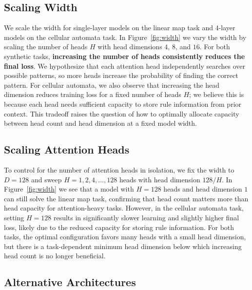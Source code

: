 \documentclass{article}
\newcommand{\xxcomment}[4]{}
\newcommand{\vatsal}[1]{}
\newcommand{\xxcomment}[4]{\textcolor{#1}{[$^{\textsc{#2}}_{\textsc{#3}}$ #4]}}
\newcommand{\vatsal}[1]{\xxcomment{pinkypink}{V}{B}{#1}}
\begin{document}
\subsection{Scaling Width}
\label{sec:width}
We scale the width for single-layer models on the linear map task and $4$-layer models on the cellular automata task. In Figure~\ref{fig:width} we vary the width by scaling the number of heads $H$ with head dimensions $4$, $8$, and $16$. For both synthetic tasks, \textbf{increasing the number of heads consistently reduces the final loss}. We hypothesize that each attention head independently searches over possible patterns, so more heads increase the probability of finding the correct pattern. For cellular automata, we also observe that increasing the head dimension reduces training loss for a fixed number of heads $H$; we believe this is because each head needs sufficient capacity to store rule information from prior context. This tradeoff raises the question of how to optimally allocate capacity between head count and head dimension at a fixed model width.

\subsection{Scaling Attention Heads}
\label{sec:heads}
To control for the number of attention heads in isolation, we fix the width to $D=128$ and sweep $H=1,2,4,\dots, 128$ heads with head dimension $128/H$. In Figure~\ref{fig:width} we see that a model with $H=128$ heads and head dimension $1$ can still solve the linear map task, confirming that head count matters more than head capacity for attention-heavy tasks. 
However, in the cellular automata task, setting $H=128$ results in significantly slower learning and slightly higher final loss, likely due to the reduced capacity for storing rule information. 
For both tasks, the optimal configuration favors many heads with a small head dimension, but there is a task-dependent minimum head dimension below which increasing head count is no longer beneficial.

\subsection{Alternative Architectures}
\label{sec:alt_arch}
\end{document}
